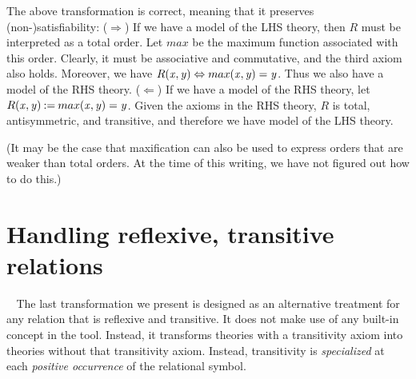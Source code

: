 \documentclass{article}
\newcommand{\Varid}[1]{\mathit{#1}}
\renewcommand{\paragraph}[1]{\vspace{0.2cm}\noindent {\bf #1} $\;\;$}
\begin{document}
The above transformation is correct, meaning that it preserves (non-)satisfiability: ($\Rightarrow$) If we have a model of the LHS theory, then \ensuremath{R} must be interpreted as a total order. Let \ensuremath{max} be the maximum function associated with this order. Clearly, it must be associative and commutative, and the third axiom also holds. Moreover, we have  \ensuremath{R\hspace{-0.1cm}\;(\Varid{x},\Varid{y})\Leftrightarrow max\hspace{-0.1cm}\;(\Varid{x},\Varid{y})\mathrel{=}\Varid{y}}. Thus we also have a model of the RHS theory. ($\Leftarrow$) If we have a model of the RHS theory, let \ensuremath{R\hspace{-0.1cm}\;(\Varid{x},\Varid{y})\mathbin{:=}max\hspace{-0.1cm}\;(\Varid{x},\Varid{y})\mathrel{=}\Varid{y}}. Given the axioms in the RHS theory, \ensuremath{R} is total, antisymmetric, and transitive, and therefore we have model of the LHS theory.

(It may be the case that maxification can also be used to express orders that are weaker than total orders. At the time of this writing, we have not figured out how to do this.)


\section{Handling reflexive, transitive relations}

\paragraph{Transification} The last transformation we present is designed as an alternative treatment for any relation that is reflexive and transitive. It does not make use of any built-in concept in the tool. Instead, it transforms theories with a transitivity axiom into theories without that transitivity axiom. Instead, transitivity is {\em specialized} at each {\em positive occurrence} of the relational symbol.
\end{document}
